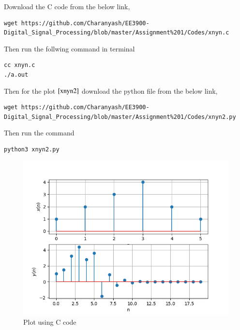 \documentclass[journal,12pt,twocolumn]{IEEEtran}
\renewcommand\thesection{\arabic{section}}
\begin{document}
\begin{enumerate}[label=\thesection.\arabic*,ref=\thesection.\theenumi]
 \solution Download the C code from the below link,
   \begin{lstlisting}
wget https://github.com/Charanyash/EE3900-Digital_Signal_Processing/blob/master/Assignment%201/Codes/xnyn.c
   \end{lstlisting}
   Then run the follwing command in terminal
    \begin{lstlisting}
cc xnyn.c
./a.out
    \end{lstlisting}
    Then for the plot $\ref{xnyn2}$ download the python file from the below link,
    \begin{lstlisting}
wget https://github.com/Charanyash/EE3900-Digital_Signal_Processing/blob/master/Assignment%201/Codes/xnyn2.py
    \end{lstlisting}
    Then run the command
    \begin{lstlisting}
python3 xnyn2.py
    \end{lstlisting}
    \begin{figure}[ht!]
      \centering
      \includegraphics[width= \columnwidth]{Figs/xnyn2.png}
      \caption{Plot using C code}
      \label{xnyn2}
    \end{figure}

\end{enumerate}
\end{document}
